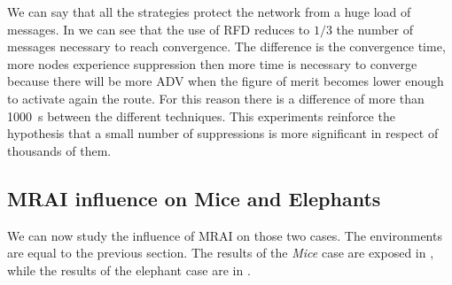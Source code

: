 We can say that all the strategies protect the network from a huge load of messages.
In  we can see that the use of \ac{RFD}
reduces to $1/3$ the number of messages necessary to reach convergence.
The difference is the convergence time, more nodes experience suppression
then more time is necessary to converge because there will be more \ac{ADV} when
the figure of merit becomes lower enough to activate again the route.
For this reason there is a difference of more than \SI{1000}{\second} between
the different techniques.
This experiments reinforce the hypothesis that a small number of suppressions is
more significant in respect of thousands of them.

\subsection{MRAI influence on Mice and Elephants}
\label{subsec:bgp_rfd_mrai_influence_mice_elephants}

We can now study the influence of \ac{MRAI} on those two cases.
The environments are equal to the previous section.
The results of the \textit{Mice} case are exposed in ,
while the results of the elephant case are in .

